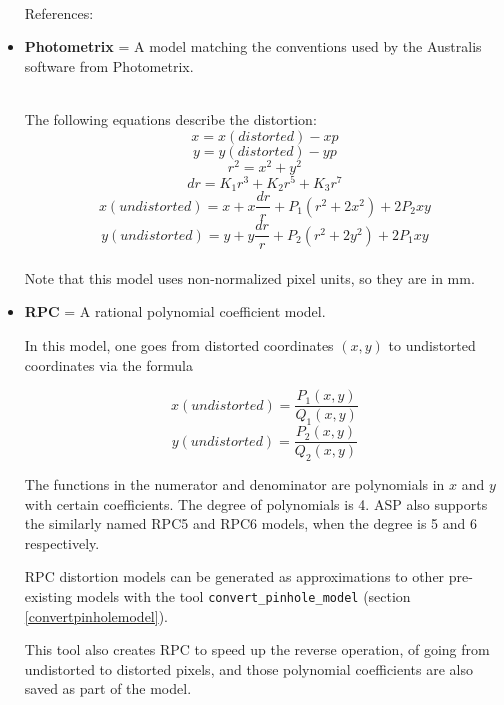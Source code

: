 \begin{itemize}{}
\hfill \\ References:

\item  \textbf{Photometrix} = A model matching the conventions used by the Australis software from Photometrix.

\hfill \\ The following equations describe the distortion:
\[ x = x(distorted) - xp \]
\[ y = y(distorted) - yp \]
\[ r^{2} = x^{2} + y^{2} \]
\[ dr = K_{1}r^{3} + K_{2}r^{5} + K_{3}r^{7} \]
\[ x(undistorted) = x + x\frac{dr}{r} + P_{1}(r^{2} +2x^{2}) + 2P_{2}xy \]
\[ y(undistorted) = y + y\frac{dr}{r} + P_{2}(r^{2} +2y^{2}) + 2P_{1}xy \]
\hfill \\ Note that this model uses non-normalized pixel units, so they
are in mm.

\item  \textbf{RPC} = A rational polynomial coefficient model.

In this model, one goes from distorted coordinates $(x, y)$ to undistorted
coordinates via the formula

\[ x(undistorted) = \frac{P_1(x, y)}{Q_1(x, y)} \]
\[ y(undistorted) = \frac{P_2(x, y)}{Q_2(x, y)} \]

The functions in the numerator and denominator are polynomials in $x$
and $y$ with certain coefficients. The degree of
polynomials is 4. ASP also supports the similarly named RPC5 and RPC6
models, when the degree is 5 and 6 respectively.

RPC distortion models can be generated as approximations to other pre-existing
models with the tool \texttt{convert\_pinhole\_model} (section \ref{convertpinholemodel}).

This tool also creates RPC to speed up the reverse operation, of going
from undistorted to distorted pixels, and those polynomial coefficients
are also saved as part of the model.

\end{itemize}

